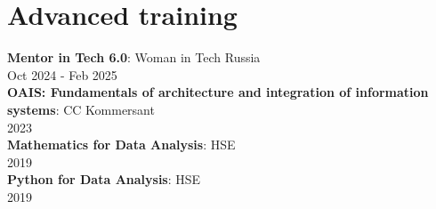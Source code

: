 \documentclass[letterpaper,11pt,english,russian]{article}
\begin{document}
\section{Advanced training}
 \begin{itemize}[leftmargin=0.15in, label={}]
    \small{\item{
     \textbf{Mentor in Tech 6.0}{: Woman in Tech Russia\\ Oct 2024 - Feb 2025} \\
     \textbf{OAIS: Fundamentals of architecture and integration of information systems}{: CC Kommersant\\ 2023} \\
     \textbf{Mathematics for Data Analysis}{: HSE\\ 2019} \\
     \textbf{Python for Data Analysis}{: HSE\\ 2019}
    }}
 \end{itemize}


\end{document}
